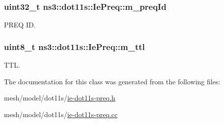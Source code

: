 \subsubsection[{\texorpdfstring{m\+\_\+preq\+Id}{m_preqId}}]{\setlength{\rightskip}{0pt plus 5cm}uint32\+\_\+t ns3\+::dot11s\+::\+Ie\+Preq\+::m\+\_\+preq\+Id\hspace{0.3cm}{\ttfamily [private]}}\hypertarget{classns3_1_1dot11s_1_1IePreq_a6c44925a70c9b23648530ad92919b976}{}\label{classns3_1_1dot11s_1_1IePreq_a6c44925a70c9b23648530ad92919b976}


P\+R\+EQ ID. 

\subsubsection[{\texorpdfstring{m\+\_\+ttl}{m_ttl}}]{\setlength{\rightskip}{0pt plus 5cm}uint8\+\_\+t ns3\+::dot11s\+::\+Ie\+Preq\+::m\+\_\+ttl\hspace{0.3cm}{\ttfamily [private]}}\hypertarget{classns3_1_1dot11s_1_1IePreq_abb359cf45de091550c6b641ed0e44bd5}{}\label{classns3_1_1dot11s_1_1IePreq_abb359cf45de091550c6b641ed0e44bd5}


T\+TL. 



The documentation for this class was generated from the following files\+:\begin{DoxyCompactItemize}
\item 
mesh/model/dot11s/\hyperlink{ie-dot11s-preq_8h}{ie-\/dot11s-\/preq.\+h}\item 
mesh/model/dot11s/\hyperlink{ie-dot11s-preq_8cc}{ie-\/dot11s-\/preq.\+cc}\end{DoxyCompactItemize}
